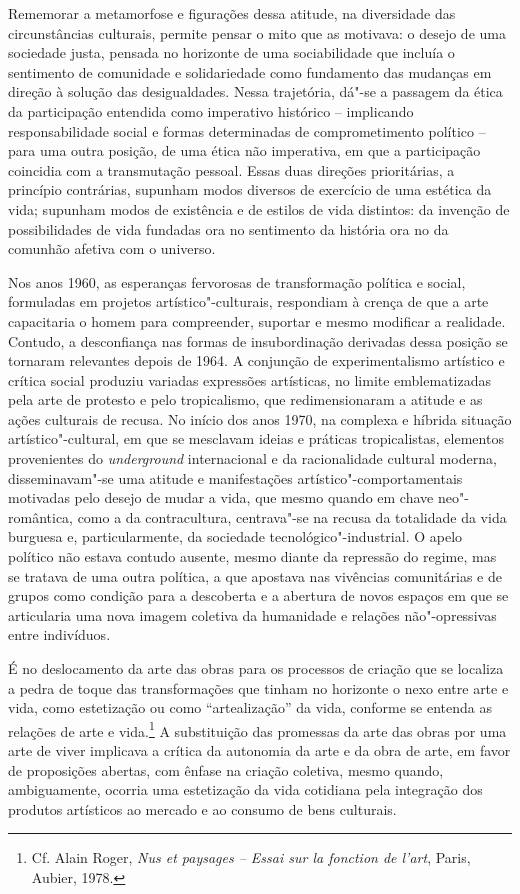 Rememorar a metamorfose e figurações dessa atitude, na diversidade das
circunstâncias culturais, permite pensar o mito que as motivava: o
desejo de uma sociedade justa, pensada no horizonte de uma sociabilidade
que incluía o sentimento de comunidade e solidariedade como fundamento
das mudanças em direção à solução das desigualdades. Nessa trajetória,
dá"-se a passagem da ética da participação entendida como imperativo
histórico -- implicando responsabilidade social e formas determinadas de
comprometimento político -- para uma outra posição, de uma ética não
imperativa, em que a participação coincidia com a transmutação pessoal.
Essas duas direções prioritárias, a princípio contrárias, supunham modos
diversos de exercício de uma estética da vida; supunham modos de
existência e de estilos de vida distintos: da invenção de possibilidades
de vida fundadas ora no sentimento da história ora no da comunhão
afetiva com o universo.

Nos anos 1960, as esperanças fervorosas de transformação política e
social, formuladas em projetos artístico"-culturais, respondiam à crença
de que a arte capacitaria o homem para compreender, suportar e mesmo
modificar a realidade. Contudo, a desconfiança nas formas de
insubordinação derivadas dessa posição se tornaram relevantes depois de
1964. A conjunção de experimentalismo artístico e crítica social
produziu variadas expressões artísticas, no limite emblematizadas pela
arte de protesto e pelo tropicalismo, que redimensionaram a atitude e as
ações culturais de recusa. No início dos anos 1970, na complexa e
híbrida situação artístico"-cultural, em que se mesclavam ideias e
práticas tropicalistas, elementos provenientes do \emph{underground}
internacional e da racionalidade cultural moderna, disseminavam"-se uma
atitude e manifestações artístico"-comportamentais motivadas pelo desejo
de mudar a vida, que mesmo quando em chave neo"-romântica, como a da
contracultura, centrava"-se na recusa da totalidade da vida burguesa e,
particularmente, da sociedade tecnológico"-industrial. O apelo político
não estava contudo ausente, mesmo diante da repressão do regime, mas se
tratava de uma outra política, a que apostava nas vivências comunitárias
e de grupos como condição para a descoberta e a abertura de novos
espaços em que se articularia uma nova imagem coletiva da humanidade e
relações não"-opressivas entre indivíduos.

É no deslocamento da arte das obras para os processos de criação que se
localiza a pedra de toque das transformações que tinham no horizonte o
nexo entre arte e vida, como estetização ou como ``artealização'' da
vida, conforme se entenda as relações de arte e vida.\footnote{Cf. Alain Roger, \emph{Nus et paysages -- Essai sur la fonction de l'art}, Paris, Aubier, 1978.}
A substituição das promessas da arte das obras por uma arte de viver
implicava a crítica da autonomia da arte e da obra de arte, em favor de
proposições abertas, com ênfase na criação coletiva, mesmo quando,
ambiguamente, ocorria uma estetização da vida cotidiana pela integração
dos produtos artísticos ao mercado e ao consumo de bens culturais.

